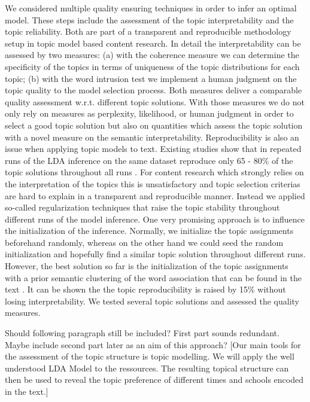 \documentclass[a4paper,10pt]{article}
\newcommand{\TODO}[1]{\begingroup\color{red}#1\endgroup}
\newcommand{\NR}[1]{\begingroup\color{orange}#1\endgroup}
\begin{document}
We considered multiple quality ensuring techniques in
order to infer an optimal model. \NR{These} steps include the assessment of the
topic interpretability and the topic reliability. Both are part of a
transparent and reproducible methodology setup in topic model based content
research.  In detail the interpretability can be assessed by two
measures\NR{: (a) w}ith the coherence measure \cite{newman:2010} we can determine the
specificity of the topics in terms of uniqueness of the topic distributions
for each topic\NR{; (b) w}ith the word intrusion test \cite{chang:2009} we implement a human
judgment on the topic quality to the model selection process. Both measures
deliver a comparable quality assessment w.r.t. different topic
solutions. With those measures we do not only rely on measures as
perplexity, likelihood, or human judgment in order to select a good topic
solution but also on quantities which assess the topic solution with a novel
measure on the semantic interpretability. Reproducibility is also an issue
when applying topic models to text. Existing studies show that in repeated
runs of the LDA inference on the same dataset reproduce only 65 - 80\% of
the topic solutions throughout all runs \cite{niekler:2012,koltcov:2016}. For content
research which strongly relies on the interpretation of the topics this is
unsatisfactory and topic selection criterias are hard to explain in a
transparent and reproducible manner. Instead we applied so-called
regularization techniques that
raise the topic stability throughout different runs of the model inference. One  very promising approach is to influence the
initialization of the inference. Normally, we initialize the topic
assignments beforehand randomly, \NR{whereas o}n the other hand we could seed the random
initialization and hopefully find a similar topic solution throughout
different runs. However, the best solution so far is the initialization of
the topic assignments with a prior semantic clustering of the word
association that can be found in the text \cite{lancichinetti:2015}. It can be
shown the the topic reproducibility is raised by 15\% without losing
interpretability. We tested several topic solutions and assessed the
quality measures. 


\TODO{Should following paragraph still be included?} \NR{First part sounds 
redundant. Maybe include second part later as an aim of this approach?}
  [Our main tools for the assessment of the topic structure is topic
  modelling.  We will apply the well understood LDA Model to
  the ressources. The resulting topical structure can then be used to
  reveal the topic preference of different times and schools encoded
  in the text.]
\end{document}
